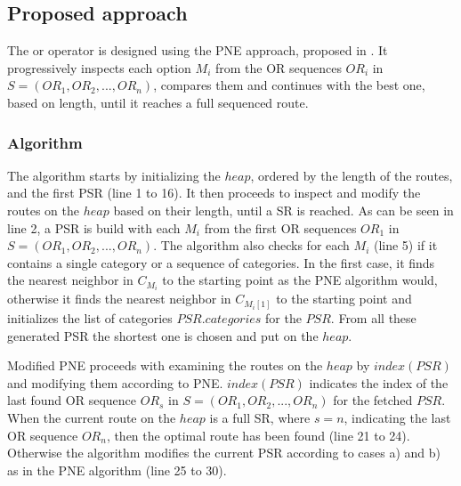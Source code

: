 
\subsection{Proposed approach} 
\label{sec:approachOr}
The or operator is designed using the PNE approach, proposed in \cite{OSR}. It progressively inspects each option $M_i$ from the OR sequences $OR_i$ in \newline $S = (OR_1, OR_2, ..., OR_n)$, compares them and continues with the best one, based on length, until it reaches a full sequenced route.

\subsubsection{Algorithm}
\label{sec:algortihmOr}
The algorithm \texttt{} starts by initializing the $heap$, ordered by the length of the routes, and the first PSR (line 1 to 16). It then proceeds to inspect and modify the routes on the $heap$ based on their length, until a SR is reached. As can be seen in line 2, a PSR is build with each $M_i$ from the first OR sequences $OR_1$ in $S = (OR_1, OR_2, ..., OR_n)$. The algorithm also checks for each $M_i$ (line 5) if it contains a single category or a sequence of categories. In the first case, it finds the nearest neighbor in $C_{M_i}$ to the starting point as the PNE algorithm would, otherwise it finds the nearest neighbor in $C_{M_i[1]}$ to the starting point and initializes the list of categories $PSR.categories$ for the $PSR$. From all these generated PSR the shortest one is chosen and put on the $heap$.

Modified PNE proceeds with examining the routes on the $heap$ by $index(PSR)$ and modifying them according to PNE. $index(PSR)$ indicates the index of the last found OR sequence $OR_s$ in $S = (OR_1, OR_2, ..., OR_n)$ for the fetched $PSR$. When the current route on the $heap$ is a full SR, where $s = n$, indicating the last OR sequence $OR_n$, then the optimal route has been found (line 21 to 24). Otherwise the algorithm modifies the current PSR according to cases a) and b) as in the PNE algorithm (line 25 to 30). \newline

